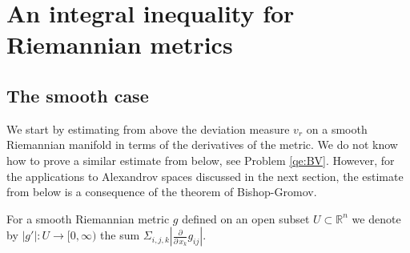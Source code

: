 \documentclass[12pt,leqno]{amsart}
\numberwithin{equation}{section}
\newtheorem{prop}[thm]{PROPOSITION}
\theoremstyle{definition}
\newtheorem{defn}[thm]{Definition}%
\theoremstyle{remark}
\newcommand{\R}{\mathbb{R}}
\def\:{\colon}
\begin{document}






\section{An integral inequality for Riemannian metrics}\label{sec-BV-estimate}
\subsection{The smooth case} We start by estimating from above the deviation measure $v_r$  on a smooth Riemannian manifold in terms of the
derivatives of the metric.  We do not know how to prove a similar estimate from below, see  Problem \ref{qe:BV}. However, for the applications
to Alexandrov spaces discussed in the next section, the  estimate from below is a consequence of the theorem of Bishop-Gromov.

For a smooth Riemannian metric $g$ defined on an open subset $U\subset \R^n$ we denote by $|g'|:U\to [0,\infty)$ the sum $\Sigma_{i,j,k}|\frac \partial {\partial \,x_k} g_{ij}|$.

\end{document}
